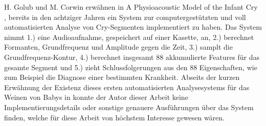 H. Golub und M. Corwin erwähnen in \glqq A Physioacoustic Model of the Infant Cry\grqq{} \cite{cryModel} , bereits in den achtziger Jahren ein System zur computergestützten und voll automatisierten Analyse von Cry-Segmenten implementiert zu haben. Das System nimmt 1.) eine Audioaufnahme, gespeichert auf einer Kasette, an, 2.) berechnet Formanten, Grundfrequenz und Amplitude gegen die Zeit, 3.) samplt die Grundfrequenz-Kontur, 4.) berechnet insgesamt 88 akkumulierte Features für das gesamte Segment und 5.) zieht Schlussfolgerungen aus den 88 Eigenschaften, wie zum Beispiel die Diagnose einer bestimmten Krankheit.\cite[S. 75 - 76]{cryModel} Abseits der kurzen Erwähnung der Existenz dieses ersten automatisierten Analysesystems für das Weinen von Babys in \cite{cryModel} konnte der Autor dieser Arbeit keine Implementierungsdetails oder sonstige genauere Ausführungen über das System finden, welche für diese Arbeit von höchstem Interesse gewesen wären.






